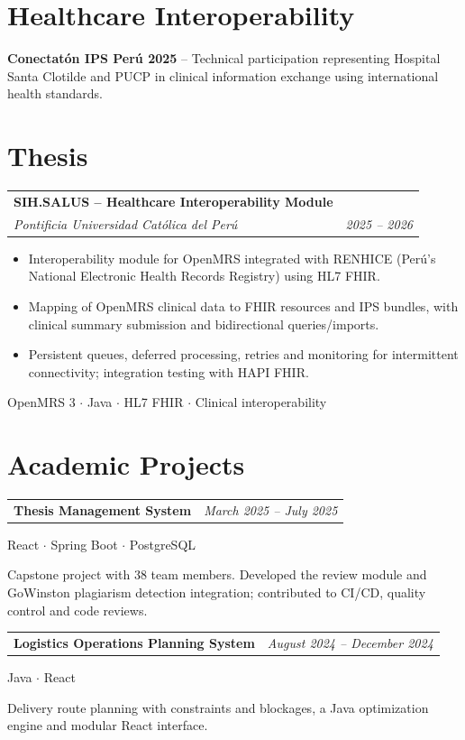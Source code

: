 \documentclass[a4paper,10pt]{article}
\makeatletter
\newcommand{\cvsubheading}[4]{
  \vspace{2pt}
  \begin{tabularx}{\textwidth}{@{}X r@{}}
    \textbf{#1} & \textit{\small #2} \\
    \textit{\small\color{graytext} #3} & \textit{\small\color{graytext} #4} \\
  \end{tabularx}\vspace{-2pt}
}
\newcommand{\cvproject}[3]{
  \vspace{2pt}
  \begin{tabularx}{\textwidth}{@{}X r@{}}
    \textbf{#1} & \textit{\small #2} \\
  \end{tabularx}
  {\small\color{graytext} #3}\vspace{-2pt}
}
\makeatother
\begin{document}
\section{Healthcare Interoperability}
\textbf{Conectatón IPS Perú 2025} -- Technical participation representing Hospital Santa Clotilde and PUCP in clinical information exchange using international health standards.

\newpage
\section{Thesis}

\cvsubheading
  {SIH.SALUS -- Healthcare Interoperability Module}{}
  {Pontificia Universidad Cat\'olica del Per\'u}{2025 -- 2026}

\begin{itemize}[leftmargin=16pt, itemsep=1.5pt, parsep=0pt, topsep=3pt]
  \item Interoperability module for OpenMRS integrated with RENHICE (Per\'u's National Electronic Health Records Registry) using HL7 FHIR.
  \item Mapping of OpenMRS clinical data to FHIR resources and IPS bundles, with clinical summary submission and bidirectional queries/imports.
  \item Persistent queues, deferred processing, retries and monitoring for intermittent connectivity; integration testing with HAPI FHIR.
\end{itemize}
{\scriptsize\color{graytext} OpenMRS 3 $\cdot$ Java $\cdot$ HL7 FHIR $\cdot$ Clinical interoperability} 

\section{Academic Projects}

\cvproject{Thesis Management System}{March 2025 -- July 2025}{React $\cdot$ Spring Boot $\cdot$ PostgreSQL}
\par\smallskip Capstone project with 38 team members. Developed the review module and GoWinston plagiarism detection integration; contributed to CI/CD, quality control and code reviews.\par\medskip

\cvproject{Logistics Operations Planning System}{August 2024 -- December 2024}{Java $\cdot$ React}
\par\smallskip Delivery route planning with constraints and blockages, a Java optimization engine and modular React interface.\par\medskip
\end{document}
